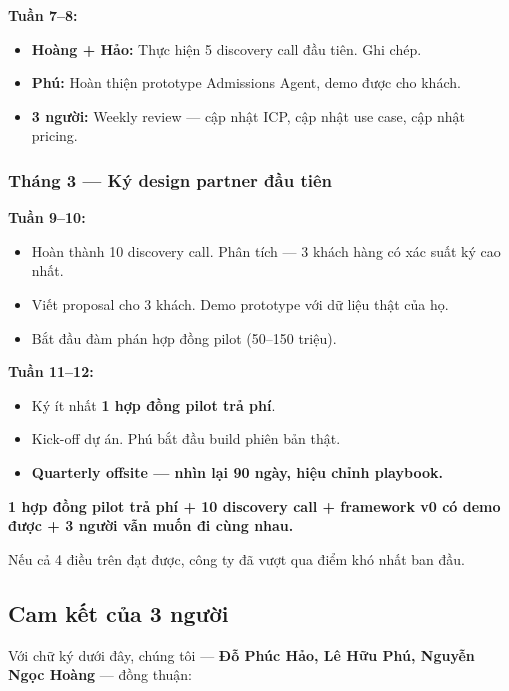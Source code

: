 \documentclass[11pt,a4paper]{article}
\begin{document}
\textbf{Tuần 7--8:}
\begin{itemize}
\item \textbf{Hoàng + Hảo:} Thực hiện 5 discovery call đầu tiên. Ghi chép.
\item \textbf{Phú:} Hoàn thiện prototype Admissions Agent, demo được cho khách.
\item \textbf{3 người:} Weekly review --- cập nhật ICP, cập nhật use case, cập nhật pricing.
\end{itemize}

\subsubsection*{Tháng 3 --- Ký design partner đầu tiên}

\textbf{Tuần 9--10:}
\begin{itemize}
\item Hoàn thành 10 discovery call. Phân tích --- 3 khách hàng có xác suất ký cao nhất.
\item Viết proposal cho 3 khách. Demo prototype với dữ liệu thật của họ.
\item Bắt đầu đàm phán hợp đồng pilot (50--150 triệu).
\end{itemize}

\textbf{Tuần 11--12:}
\begin{itemize}
\item Ký ít nhất \textbf{1 hợp đồng pilot trả phí}.
\item Kick-off dự án. Phú bắt đầu build phiên bản thật.
\item \textbf{Quarterly offsite --- nhìn lại 90 ngày, hiệu chỉnh playbook.}
\end{itemize}

\begin{keybox}[title=Mốc thành công của 90 ngày]
\textbf{1 hợp đồng pilot trả phí + 10 discovery call + framework v0 có demo được + 3 người vẫn muốn đi cùng nhau.}

Nếu cả 4 điều trên đạt được, công ty đã vượt qua điểm khó nhất ban đầu.
\end{keybox}

\subsection{Cam kết của 3 người}

\vspace{1em}

Với chữ ký dưới đây, chúng tôi --- \textbf{Đỗ Phúc Hảo, Lê Hữu Phú, Nguyễn Ngọc
Hoàng} --- đồng thuận:
\end{document}
